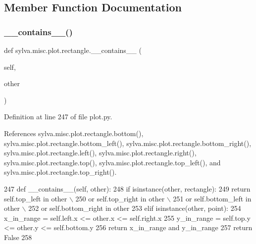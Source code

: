 \subsection{Member Function Documentation}
\mbox{\label{classsylva_1_1misc_1_1plot_1_1rectangle_a097b8412cf074afb98f7f88cd0e2f1bc}} 
\subsubsection{\texorpdfstring{\+\_\+\+\_\+contains\+\_\+\+\_\+()}{\_\_contains\_\_()}}
{\footnotesize\ttfamily def sylva.\+misc.\+plot.\+rectangle.\+\_\+\+\_\+contains\+\_\+\+\_\+ (\begin{DoxyParamCaption}\item[{}]{self,  }\item[{}]{other }\end{DoxyParamCaption})}



Definition at line 247 of file plot.\+py.



References sylva.\+misc.\+plot.\+rectangle.\+bottom(), sylva.\+misc.\+plot.\+rectangle.\+bottom\+\_\+left(), sylva.\+misc.\+plot.\+rectangle.\+bottom\+\_\+right(), sylva.\+misc.\+plot.\+rectangle.\+left(), sylva.\+misc.\+plot.\+rectangle.\+right(), sylva.\+misc.\+plot.\+rectangle.\+top(), sylva.\+misc.\+plot.\+rectangle.\+top\+\_\+left(), and sylva.\+misc.\+plot.\+rectangle.\+top\+\_\+right().


\begin{DoxyCode}
247         \textcolor{keyword}{def }\_\_contains\_\_(self, other):
248             \textcolor{keywordflow}{if} isinstance(other, rectangle):
249                 \textcolor{keywordflow}{return} self.top\_left \textcolor{keywordflow}{in} other \(\backslash\)
250                     \textcolor{keywordflow}{or} self.top\_right \textcolor{keywordflow}{in} other \(\backslash\)
251                     \textcolor{keywordflow}{or} self.bottom\_left \textcolor{keywordflow}{in} other \(\backslash\)
252                     \textcolor{keywordflow}{or} self.bottom\_right \textcolor{keywordflow}{in} other
253             \textcolor{keywordflow}{elif} isinstance(other, point):
254                 x\_in\_range = self.left.x <= other.x <= self.right.x
255                 y\_in\_range = self.top.y <= other.y <= self.bottom.y
256                 \textcolor{keywordflow}{return} x\_in\_range \textcolor{keywordflow}{and} y\_in\_range
257             \textcolor{keywordflow}{return} \textcolor{keyword}{False}
258 
\end{DoxyCode}
\mbox{\label{classsylva_1_1misc_1_1plot_1_1rectangle_a1ad220e20ea15beaeafdd814705d570e}} 
